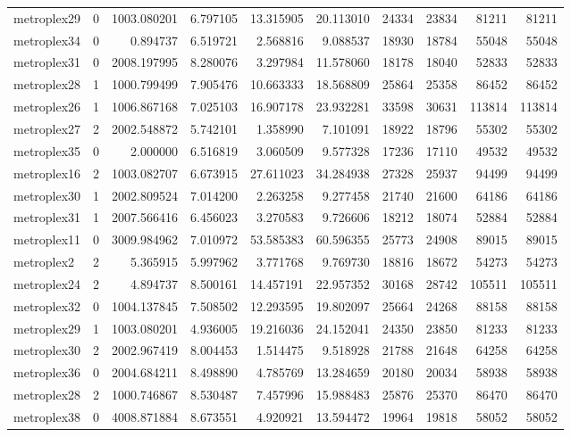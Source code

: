 \begin{longtable}{|l|r|r|r|r|r|r|r|r|r|}
metroplex29 & 0 & 1003.080201 & 6.797105 & 13.315905 & 20.113010 & 24334 & 23834 & 81211 & 81211 \\
metroplex34 & 0 & 0.894737 & 6.519721 & 2.568816 & 9.088537 & 18930 & 18784 & 55048 & 55048 \\
metroplex31 & 0 & 2008.197995 & 8.280076 & 3.297984 & 11.578060 & 18178 & 18040 & 52833 & 52833 \\
metroplex28 & 1 & 1000.799499 & 7.905476 & 10.663333 & 18.568809 & 25864 & 25358 & 86452 & 86452 \\
metroplex26 & 1 & 1006.867168 & 7.025103 & 16.907178 & 23.932281 & 33598 & 30631 & 113814 & 113814 \\
metroplex27 & 2 & 2002.548872 & 5.742101 & 1.358990 & 7.101091 & 18922 & 18796 & 55302 & 55302 \\
metroplex35 & 0 & 2.000000 & 6.516819 & 3.060509 & 9.577328 & 17236 & 17110 & 49532 & 49532 \\
metroplex16 & 2 & 1003.082707 & 6.673915 & 27.611023 & 34.284938 & 27328 & 25937 & 94499 & 94499 \\
metroplex30 & 1 & 2002.809524 & 7.014200 & 2.263258 & 9.277458 & 21740 & 21600 & 64186 & 64186 \\
metroplex31 & 1 & 2007.566416 & 6.456023 & 3.270583 & 9.726606 & 18212 & 18074 & 52884 & 52884 \\
metroplex11 & 0 & 3009.984962 & 7.010972 & 53.585383 & 60.596355 & 25773 & 24908 & 89015 & 89015 \\
metroplex2 & 2 & 5.365915 & 5.997962 & 3.771768 & 9.769730 & 18816 & 18672 & 54273 & 54273 \\
metroplex24 & 2 & 4.894737 & 8.500161 & 14.457191 & 22.957352 & 30168 & 28742 & 105511 & 105511 \\
metroplex32 & 0 & 1004.137845 & 7.508502 & 12.293595 & 19.802097 & 25664 & 24268 & 88158 & 88158 \\
metroplex29 & 1 & 1003.080201 & 4.936005 & 19.216036 & 24.152041 & 24350 & 23850 & 81233 & 81233 \\
metroplex30 & 2 & 2002.967419 & 8.004453 & 1.514475 & 9.518928 & 21788 & 21648 & 64258 & 64258 \\
metroplex36 & 0 & 2004.684211 & 8.498890 & 4.785769 & 13.284659 & 20180 & 20034 & 58938 & 58938 \\
metroplex28 & 2 & 1000.746867 & 8.530487 & 7.457996 & 15.988483 & 25876 & 25370 & 86470 & 86470 \\
metroplex38 & 0 & 4008.871884 & 8.673551 & 4.920921 & 13.594472 & 19964 & 19818 & 58052 & 58052 \\

\end{longtable}

